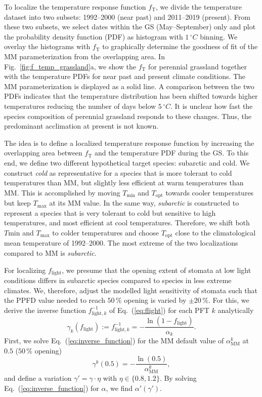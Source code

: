 \documentclass[bg, manuscript]{copernicus}
\begin{document}
To localize the temperature response function $f_\mathrm{T}$, we divide the temperature dataset into two subsets: 1992--2000 (near past) and 2011--2019 (present). From these two subsets, we select dates within the GS (May--September) only and plot the probability density function (PDF) as histogram with $1\,\unit{^\circ C}$ binning. We overlay the histograms with $f_\mathrm{T}$ to graphically determine the goodness of fit of the MM parameterization from the overlapping area. In Fig.~\ref{fig:f_temp_grassland}a, we show the $f_\mathrm{T}$ for perennial grassland together with the temperature PDFs for near past and present climate conditions. The MM parameterization is displayed as a solid line. A comparison between the two PDFs indicates that the temperature distribution has been shifted towards higher temperatures reducing the number of days below $5\,\unit{^\circ C}$. It is unclear how fast the species composition of perennial grassland responds to these changes. Thus, the predominant acclimation at present is not known.

The idea is to define a localized temperature response function by increasing the overlapping area between $f_\mathrm{T}$ and the temperature PDF during the GS. To this end, we define two different hypothetical target species: subarctic and cold. We construct \emph{cold} as representative for a species that is more tolerant to cold temperatures than MM, but slightly less efficient at warm temperatures than MM. This is accomplished by moving $T_\mathrm{min}$ and $T_\mathrm{opt}$ towards cooler temperatures but keep $T_\mathrm{max}$ at its MM value. In the same way, \emph{subarctic} is constructed to represent a species that is very tolerant to cold but sensitive to high temperatures, and most efficient at cool temperatures. Therefore, we shift both $T\mathrm{min}$ and $T_\mathrm{max}$ to colder temperatures and choose $T_\mathrm{opt}$ close to the climatological mean temperature of 1992--2000. The most extreme of the two localizations compared to MM is \emph{subarctic}.

For localizing $f_\mathrm{light}$, we presume that the opening extent of stomata at low light conditions differs in subarctic species compared to species in less extreme climates. We, therefore, adjust the modelled light sensitivity of stomata such that the PPFD value needed to reach $50\,\unit{\%}$ opening is varied by $\pm 20\,\unit{\%}$. For this, we derive the inverse function $f_{\mathrm{light},k}^{-1}$ of Eq.~(\ref{eq:flight}) for each PFT $k$ analytically
%
\begin{equation}
  \gamma_k(f_\mathrm{light}) := f_{\mathrm{light}, k}^{-1} = -\frac{\ln(1-f_\mathrm{light})}{\alpha_k}.
  \label{eq:inverse_function}
\end{equation}
%
First, we solve Eq.~(\ref{eq:inverse_function}) for the MM default value of $\alpha_\mathrm{MM}^k$ at $0.5$ ($50\,\%$ opening)
\begin{equation}
  \gamma^k(0.5) = -\frac{\ln(0.5)}{\alpha_\mathrm{MM}^k},
  \label{eq:inverse_function_halfway}
\end{equation}
and define a variation $\gamma' = \gamma \cdot \eta$ with $\eta \in \{0.8, 1.2\}$. By solving Eq.~(\ref{eq:inverse_function}) for $\alpha$, we find $\alpha'(\gamma')$. 
\end{document}
